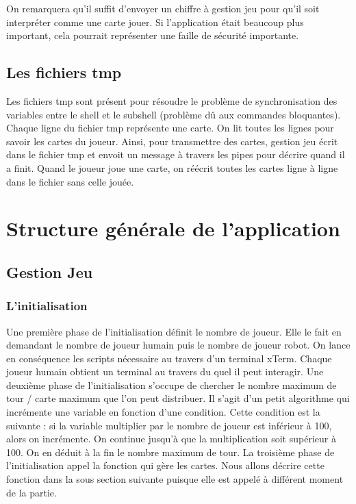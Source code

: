 \documentclass{article}
\begin{document}
\begin{itemize}
On remarquera qu'il suffit d'envoyer un chiffre à gestion jeu pour qu'il soit interpréter comme une carte jouer. Si l'application était beaucoup plus important, cela pourrait représenter une faille de sécurité importante. 
  
\end{itemize}

\newpage
\subsection{Les fichiers tmp}
Les fichiers tmp sont présent pour résoudre le problème de synchronisation des variables entre le shell et le subshell (problème dû aux commandes bloquantes). Chaque ligne du fichier tmp représente une carte. On lit toutes les lignes pour savoir les cartes du joueur. Ainsi, pour transmettre des cartes, gestion jeu écrit dans le fichier tmp et envoit un message à travers les pipes pour décrire quand il a finit. Quand le joueur joue une carte, on réécrit toutes les cartes ligne à ligne dans le fichier sans celle jouée.


\section{Structure générale de l'application}

\subsection{Gestion Jeu}
\subsubsection{L'initialisation}

Une première phase de l'initialisation définit le nombre de joueur. Elle le fait en demandant le nombre de joueur humain puis le nombre de joueur robot. On lance en conséquence les scripts nécessaire au travers d'un terminal xTerm. Chaque joueur humain obtient un terminal au travers du quel il peut interagir.
\newline
\newline
Une deuxième phase de l'initialisation s'occupe de chercher le nombre maximum de tour / carte maximum que l'on peut distribuer. Il s'agit d'un petit algorithme qui incrémente une variable en fonction d'une condition. Cette condition est la suivante : si la variable multiplier par le nombre de joueur est inférieur à 100, alors on incrémente. On continue jusqu'à que la multiplication soit supérieur à 100. On en déduit à la fin le nombre maximum de tour.
\newline
\newline
La troisième phase de l'initialisation appel la fonction qui gère les cartes. Nous allons décrire cette fonction dans la sous section suivante puisque elle est appelé à différent moment de la partie.  
\end{document}
